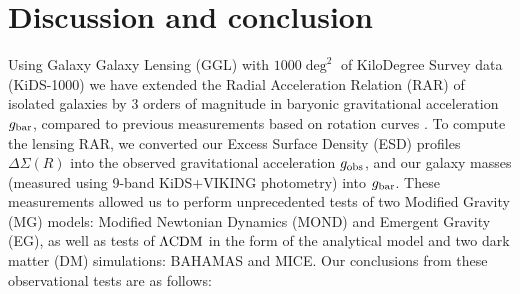\documentclass[usenatbib]{mnras}
\newcommand{\lcdm}{{\rm \Lambda CDM}}
\newcommand{\un}[1]{_{\rm #1}}
\begin{document}
\section{Discussion and conclusion}
\label{sec:discon}

Using Galaxy Galaxy Lensing (GGL) with $1000 \deg^2$ of KiloDegree Survey data (KiDS-1000) we have extended the Radial Acceleration Relation (RAR) of isolated galaxies by $3$ orders of magnitude in baryonic gravitational acceleration $g\un{bar}$, compared to previous measurements based on rotation curves \cite[most notably][M16]{mcgaugh2016}. To compute the lensing RAR, we converted our Excess Surface Density (ESD) profiles $\Delta\Sigma(R)$ into the observed gravitational acceleration $g\un{obs}$, and our galaxy masses (measured using 9-band KiDS+VIKING photometry) into $g\un{bar}$. These measurements allowed us to perform unprecedented tests of two Modified Gravity (MG) models: Modified Newtonian Dynamics (MOND) and Emergent Gravity (EG), as well as tests of $\lcdm$ in the form of the \cite[][N17]{navarro2017} analytical model and two dark matter (DM) simulations: BAHAMAS and MICE. Our conclusions from these observational tests are as follows:
\end{document}

